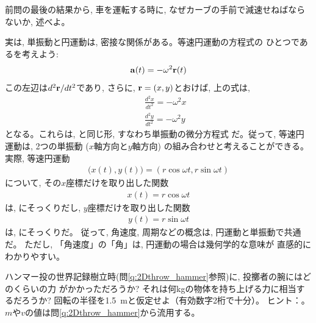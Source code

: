 \begin{q}\label{q:car_slip}
前問の最後の結果から, 車を運転する時に, なぜカーブの手前で減速せねばならないか, 述べよ。
\end{q}
\vspace{0.2cm}




実は, 単振動と円運動は, 密接な関係がある。等速円運動の方程式の
ひとつであるを考えよう:
\begin{eqnarray*}
{\bf a}(t)=-\omega^2{\bf r}(t)
\end{eqnarray*}
この左辺は$d^2{\bf r}/dt^2$であり, さらに, ${\bf r}=(x, y)$とおけば, 上の式は, 
\begin{eqnarray}
&&\frac{d^2 x}{dt^2}=-\omega^2 x\\
&&\frac{d^2 y}{dt^2}=-\omega^2 y
\end{eqnarray}
となる。これらは, と同じ形, すなわち単振動の微分方程式
だ。従って, 等速円運動は, 2つの単振動 ($x$軸方向と$y$軸方向)
の組み合わせと考えることができる。実際, 等速円運動
\begin{eqnarray}\bigl(x(t), y(t)\bigr)=(r\cos\omega t, r\sin\omega t)\end{eqnarray}
について, その$x$座標だけを取り出した関数
\begin{eqnarray}x(t)=r\cos\omega t\end{eqnarray}
は, にそっくりだし, $y$座標だけを取り出した関数
\begin{eqnarray}y(t)=r\sin\omega t\end{eqnarray}
は, にそっくりだ。
従って, 角速度, 周期などの概念は, 円運動と単振動で共通だ。
ただし, 「角速度」の「角」は, 円運動の場合は幾何学的な意味が
直感的にわかりやすい。
\vspace{0.2cm}

\begin{q}\label{q:hammer_throw}
ハンマー投の世界記録樹立時(問\ref{q:2Dthrow_hammer}参照)に, 投擲者の腕にはどのくらいの力
がかかっただろうか? 
それは何kgの物体を持ち上げる力に相当するだろうか? 回転の半径を1.5~mと仮定せよ（有効数字2桁で十分）。
ヒント：。$m$や$v$の値は問\ref{q:2Dthrow_hammer}から流用する。
\end{q}
\vspace{0.2cm}

